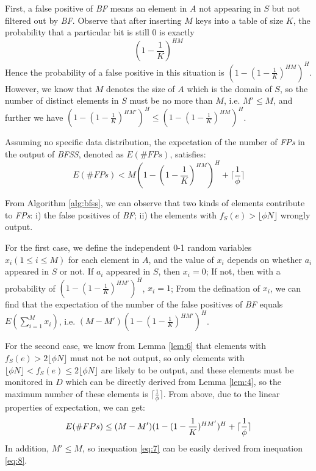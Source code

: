 \documentclass[conference]{IEEEtran}
\begin{document}
\begin{IEEEproof}
First, a false positive of \emph{BF} means an element in $A$ not appearing in $S$ but not filtered out by \emph{BF}. Observe that after inserting $M$ keys into a table of size $K$, the probability that a particular bit is still 0 is exactly
\begin{equation} 
(1-\frac{1}{K})^{HM}
\end{equation}
\indent Hence the probability of a false positive in this situation is $(1-(1-\frac{1}{K})^{HM})^H$. However, we know that $M$ denotes the size of $A$ which is the domain of $S$, so the number of distinct elements in $S$ must be no more than $M$, i.e. $M'\leq M$, and further we have $(1-(1-\frac{1}{K})^{HM'})^H\leq (1-(1-\frac{1}{K})^{HM})^H$.
\end{IEEEproof}

\begin{theorem}\label{thm:2}
Assuming no specific data distribution, the expectation of the number of \emph{FPs} in the output of \emph{BFSS}, denoted as $E(\#FPs)$, satisfies:
\begin{equation}\label{eq:7}
E(\#FPs)<M(1-(1-\frac{1}{K})^{HM})^H + \lceil\frac{1}{\phi}\rceil
\end{equation}
\end{theorem}

\begin{IEEEproof}
From Algorithm \ref{alg:bfss}, we can observe that two kinds of elements contribute to \emph{FPs}: i) the false positives of \emph{BF}; ii) the elements with $f_S(e)>\lfloor \phi N\rfloor$ wrongly output.\par
For the first case, we define the independent 0-1 random variables $x_i(1\leq i\leq M)$ for each element in $A$, and the value of $x_i$ depends on whether $a_i$ appeared in $S$ or not. If $a_i$ appeared in $S$, then $x_i=0$; If not, then with a probability of $(1-(1-\frac{1}{K})^{HM'})^H$, $x_i=1$; From the defination of $x_i$, we can find that the expectation of the number of the false positives of \emph{BF} equals $E(\sum_{i=1}^{M}x_i)$, i.e. $(M-M')(1-(1-\frac{1}{K})^{HM'})^H$.\par 
For the second case, we know from Lemma \ref{lem:6} that elements with $f_S(e)>2\lfloor \phi N\rfloor$ must not be not output, so only elements with $\lfloor \phi N\rfloor<f_S(e)\leq 2\lfloor \phi N\rfloor$ are likely to be output, and these elements must be monitored in $D$ which can be directly derived from Lemma \ref{lem:4}, so the maximum number of these elements is $\lceil\frac{1}{\phi}\rceil$. From above, due to the linear properties of expectation, we can get:
\begin{equation}\label{eq:8}
E(\#FPs)\leq (M-M')(1-(1-\frac{1}{K})^{HM'})^H+\lceil\frac{1}{\phi}\rceil\\
\end{equation}
\indent In addition, $M'\leq M$, so inequation \ref{eq:7} can be easily derived from inequation \ref{eq:8}.
\end{IEEEproof}
\end{document}
